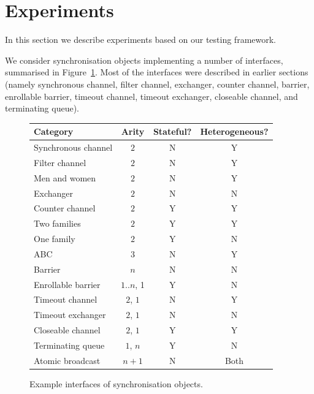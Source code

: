 \section{Experiments}
\label{sec:experiments}

In this section we describe experiments based on our testing framework. 


We consider synchronisation objects implementing a number of interfaces,
summarised in Figure~\ref{fig:examples}.  Most of the interfaces were
described in earlier sections (namely synchronous channel, filter channel,
exchanger, counter channel, barrier, enrollable barrier, timeout channel,
timeout exchanger, closeable channel, and terminating queue).


\begin{figure}
\begin{center}
\begin{tabular}{lccc}
Category            & Arity & Stateful? & Heterogeneous? \\ \hline
Synchronous channel & $2$     & N         & Y \\
Filter channel      & $2$     & N         & Y \\
Men and women        & $2$     & N         & Y \\
Exchanger           & $2$     & N         & N \\
Counter channel     & $2$     & Y         & Y \\
Two families        & $2$     & Y         & Y \\
One family          & $2$     & Y         & N \\
ABC                 & $3$     & N         & Y \\
Barrier             & $n$   & N         & N \\
Enrollable barrier  & $1\mathord{..} n$, 1 & Y & N \\
Timeout channel     & $2$, $1$  & N         & Y \\
Timeout exchanger   & $2$, $1$  & N         & N \\
Closeable channel   & $2$, $1$  & Y         & Y \\
Terminating queue   & $1$, $n$ & Y        & N  \\
Atomic broadcast    & $n+1$ & N         & Both 
\end{tabular}
\end{center}
\caption{Example interfaces of synchronisation objects.  \label{fig:examples}}
\end{figure}

